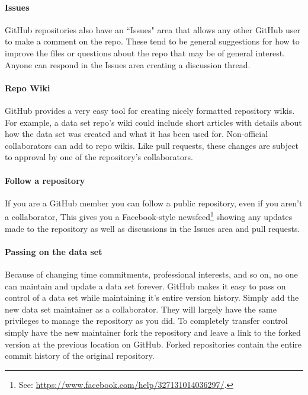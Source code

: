 \documentclass[twocolumn]{article}\usepackage{graphicx, color}
\begin{document}
\paragraph{Issues}

GitHub repositories also have an ``Issues" area that allows any other GitHub user to make a comment on the repo. These tend to be general suggestions for how to improve the files or questions about the repo that may be of general interest. Anyone can respond in the Issues area creating a discussion thread.

\paragraph{Repo Wiki}

GitHub provides a very easy tool for creating nicely formatted repository wikis. For example, a data set repo's wiki could include short articles with details about how the data set was created and what it has been used for. Non-official collaborators can add to repo wikis. Like pull requests, these changes are subject to approval by one of the repository's collaborators.

\paragraph{Follow a repository}

If you are a GitHub member you can follow a public repository, even if you aren't a collaborator, This gives you a Facebook-style newsfeed\footnote{See: \url{https://www.facebook.com/help/327131014036297/}.} showing any updates made to the repository as well as discussions in the Issues area and pull requests. 

\paragraph{Passing on the data set}

Because of changing time commitments, professional interests, and so on, no one can maintain and update a data set forever. GitHub makes it easy to pass on control of a data set while maintaining it's entire version history. Simply add the new data set maintainer as a collaborator. They will largely have the same privileges to manage the repository as you did. To completely transfer control simply have the new maintainer fork the repository and leave a link to the forked version at the previous location on GitHub. Forked repositories contain the entire commit history of the original repository.
\end{document}
